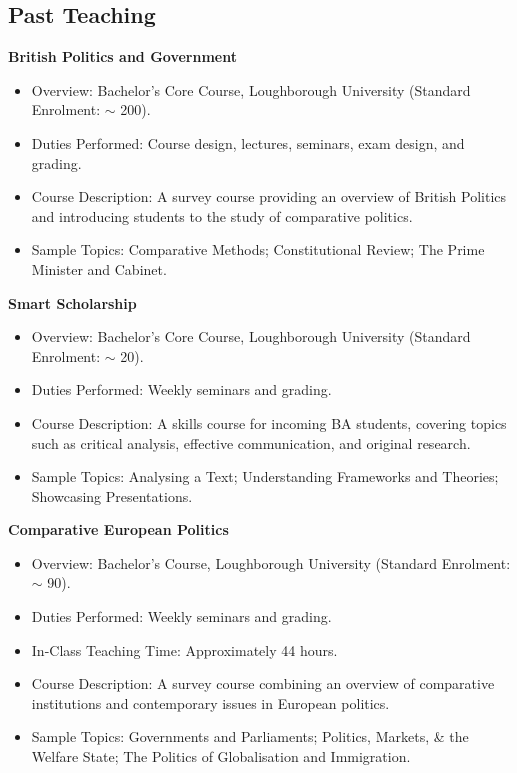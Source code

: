 \documentclass[11pt]{article}
\begin{document}
	\subsection{Past Teaching}
		  \textbf{British Politics and Government}
	      \begin{itemize}[itemsep=0em, topsep=0em, partopsep=0em]
	      	\kern-\parskip\item Overview: Bachelor’s Core Course, Loughborough University (Standard Enrolment: $\sim$ 200).
	      	\item Duties Performed: Course design, lectures, seminars, exam design, and grading.
	      	\item Course Description: A survey course providing an overview of British Politics and introducing students to the study of comparative politics. 
	      	\item Sample Topics: Comparative Methods; Constitutional Review; The Prime Minister and Cabinet.
	      \end{itemize}
	\textbf{Smart Scholarship}
	\begin{itemize}[itemsep=0em, topsep=0em, partopsep=0em]
		\kern-\parskip\item Overview: Bachelor’s Core Course, Loughborough University (Standard Enrolment: $\sim$ 20).
		\item Duties Performed: Weekly seminars and grading.
		\item Course Description: A skills course for incoming BA students, covering topics such as critical analysis, effective communication, and original research.
		\item Sample Topics: Analysing a Text; Understanding Frameworks and Theories; Showcasing Presentations.
	\end{itemize}
	\textbf{Comparative European Politics}
	      \begin{itemize}[itemsep=0em, topsep=0em, partopsep=0em]
	      	\kern-\parskip\item Overview: Bachelor’s Course, Loughborough University (Standard Enrolment: $\sim$ 90).
	      	\item Duties Performed: Weekly seminars and grading.
	      	\item In-Class Teaching Time: Approximately 44 hours. 
	      	\item Course Description: A survey course combining an overview of comparative institutions and contemporary issues in European politics.
	      	\item Sample Topics: Governments and Parliaments; Politics, Markets, \& the Welfare State; The Politics of Globalisation and Immigration.
	      \end{itemize}
\end{document}
